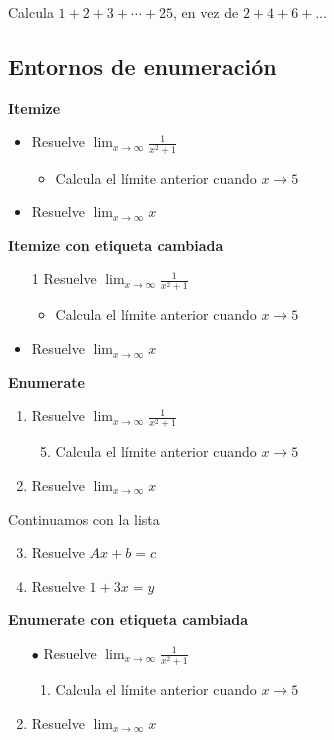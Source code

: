 Calcula $1+2+3+\cdots + 25$, en vez de $2+4+6+\dots$
\vspace{2cm}

\subsection*{Entornos de enumeración}
\textbf{Itemize}
\begin{itemize}
	\item Resuelve $\lim_{x\to \infty}\frac{1}{x^2+1}$
	\begin{itemize}
		\item Calcula el límite anterior cuando $x\to 5$
	\end{itemize} 
	\item Resuelve $\lim_{x\to \infty} x$
\end{itemize}

\textbf{Itemize con etiqueta cambiada}
\begin{itemize}
	\item[1] Resuelve $\lim_{x\to \infty}\frac{1}{x^2+1}$
	\begin{itemize}
		\item Calcula el límite anterior cuando $x\to 5$
	\end{itemize} 
	\item Resuelve $\lim_{x\to \infty} x$
\end{itemize}

\textbf{Enumerate}
\begin{enumerate}
	\item Resuelve $\lim_{x\to \infty}\frac{1}{x^2+1}$
	\begin{enumerate} \setcounter{enumii}{4} %
		\item Calcula el límite anterior cuando $x\to 5$
	\end{enumerate} 
	\item Resuelve $\lim_{x\to \infty} x$
\end{enumerate}

Continuamos con la lista

\begin{enumerate} \setcounter{enumi}{2} %
	\item Resuelve $Ax+b=c$
	\item Resuelve $1+3x=y$
\end{enumerate}

\textbf{Enumerate con etiqueta cambiada}
\begin{enumerate}
	\item[$\bullet$]Resuelve $\lim_{x\to \infty}\frac{1}{x^2+1}$
	\begin{enumerate}
		\item Calcula el límite anterior cuando $x\to 5$
	\end{enumerate} 
	\item Resuelve $\lim_{x\to \infty} x$
\end{enumerate}

